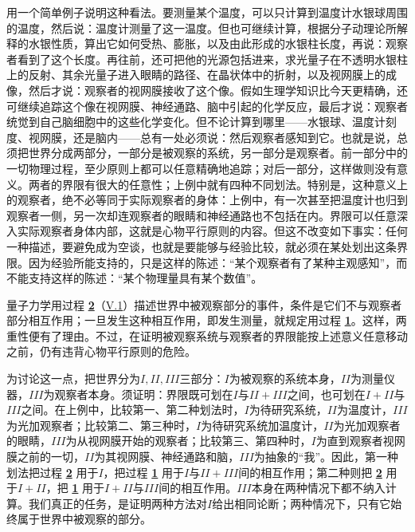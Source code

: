 \documentclass[fontsize=13pt,twoside,openany,headings=normal,parskip=false,bookmarkpackage=false,DIV=calc]{scrbook}
\newcommand{\textkaishu}[1]{{\zhkaishu #1}}
\begin{document}
用一个简单例子说明这种看法。要测量某个温度，可以只计算到温度计水银球周围的温度，然后说：温度计测量了这一温度。但也可继续计算，根据分子动理论所解释的水银性质，算出它如何受热、膨胀，以及由此形成的水银柱长度，再说：观察者看到了这个长度。再往前，还可把他的光源包括进来，求光量子在不透明水银柱上的反射、其余光量子进入眼睛的路径、在晶状体中的折射，以及视网膜上的成像，然后才说：观察者的视网膜接收了这个像。假如生理学知识比今天更精确，还可继续追踪这个像在视网膜、神经通路、脑中引起的化学反应，最后才说：观察者统觉到自己脑细胞中的这些化学变化。但不论计算到哪里——水银球、温度计刻度、视网膜，还是脑内——总有一处必须说：然后观察者感知到它。也就是说，总须把世界分成两部分，一部分是被观察的系统，另一部分是观察者。\hypertarget{origpage-224}{}\label{origpage-224}前一部分中的一切物理过程，至少原则上都可以任意精确地追踪；对后一部分，这样做则没有意义。两者的界限有很大的任意性；上例中就有四种不同划法。特别是，这种意义上的观察者，绝不必等同于实际观察者的身体：上例中，有一次甚至把温度计也归到观察者一侧，另一次却连观察者的眼睛和神经通路也不包括在内。界限可以任意深入实际观察者身体内部，这就是心物平行原则的内容。但这不改变如下事实：任何一种描述，要避免成为空谈，也就是要能够与经验比较，就必须在某处划出这条界限。因为经验所能支持的，只是这样的陈述：“\textkaishu{某个观察者有了某种主观感知}”，而不能支持这样的陈述：“\textkaishu{某个物理量具有某个数值}”。

量子力学用过程 \hyperref[eq:V.1.2]{\textbf{2}}（\hyperref[sec:V.1]{V.1}）描述世界中被观察部分的事件，条件是它们不与观察者部分相互作用；一旦发生这种相互作用，即发生测量，就规定用过程 \hyperref[eq:V.1.1]{\textbf{1}}。这样，两重性便有了理由。不过，在证明被观察系统与观察者的界限能按上述意义任意移动之前，仍有违背心物平行原则的危险。

为讨论这一点，把世界分为$I,\allowbreak II,\allowbreak III$三部分：$I$为被观察的系统本身，$II$为测量仪器，$III$为观察者本身。须证明：界限既可划在$I$与$II+III$之间，也可划在$I+II$与$III$之间。在上例中，比较第一、第二种划法时，$I$为待研究系统，$II$为温度计，$III$为光加观察者；比较第二、第三种时，$I$为待研究系统加温度计，$II$为光加观察者的眼睛，$III$为从视网膜开始的观察者；比较第三、第四种时，$I$为直到观察者视网膜之前的一切，$II$为其视网膜、神经通路和脑，$III$为抽象的“我”。因此，第一种划法把过程 \hyperref[eq:V.1.2]{\textbf{2}} 用于$I$，把过程 \hyperref[eq:V.1.1]{\textbf{1}} 用于$I$与$II+III$间的相互作用；第二种则把 \hyperref[eq:V.1.2]{\textbf{2}} 用于$I+II$，把 \hyperref[eq:V.1.1]{\textbf{1}} 用于$I+II$与$III$间的相互作用。$III$本身在两种情况下都不纳入计算。我们真正的任务，是证明两种方法对$I$给出相同论断；两种情况下，只有它始终属于世界中被观察的部分。
\end{document}
